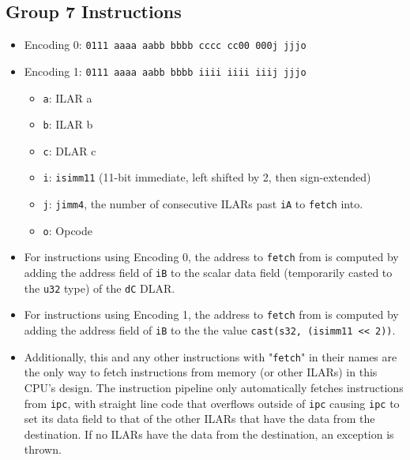 \documentclass{article}
\begin{document}
	\subsection{Group 7 Instructions}
		\begin{itemize}
		\item Encoding 0: \texttt{0111 aaaa aabb bbbb  cccc cc00 000j jjjo}
		\item Encoding 1: \texttt{0111 aaaa aabb bbbb  iiii iiii iiij jjjo}
			\begin{itemize}
			\item \texttt{a}: ILAR a
			\item \texttt{b}: ILAR b
			\item \texttt{c}: DLAR c
			\item \texttt{i}: \texttt{isimm11} (11-bit immediate, left
				shifted by 2, then sign-extended)
			\item \texttt{j}: \texttt{jimm4}, the number of consecutive
				ILARs past \texttt{iA} to \texttt{fetch} into.
			\item \texttt{o}: Opcode
			\end{itemize}

		\item For instructions using Encoding 0, the address to
			\texttt{fetch} from is computed by adding the address field of
			\texttt{iB} to the scalar data field (temporarily casted to the
			\texttt{u32} type) of the \texttt{dC} DLAR.
		\item For instructions using Encoding 1, the address to
			\texttt{fetch} from is computed by adding the address field of
			\texttt{iB} to the the value
			\texttt{cast(s32, (isimm11 << 2))}.
		\item Additionally, this and any other instructions with
			"\texttt{fetch}" in their names are the only way to fetch
			instructions from memory (or other ILARs) in this CPU's design.
			The instruction pipeline only automatically fetches
			instructions from \texttt{ipc}, with straight line code that
			overflows outside of \texttt{ipc} causing \texttt{ipc} to set
			its data field to that of the other ILARs that have the data
			from the destination. If no ILARs have the data from the
			destination, an exception is thrown.


\end{itemize}
\end{document}
